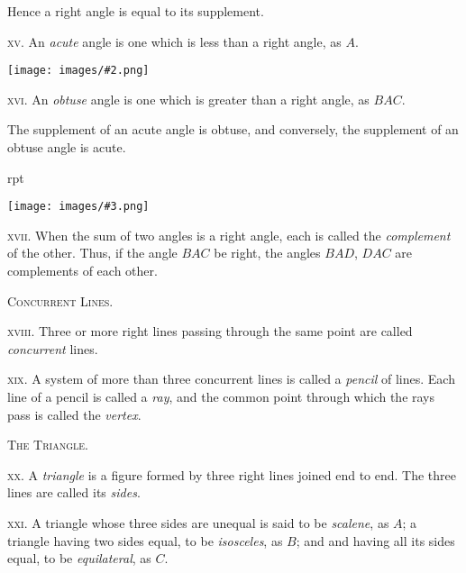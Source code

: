 \documentclass[oneside]{book}
\newcounter{wrapwidth}
\newcommand\imgflow[3]{
\setcounter{wrapwidth}{#1}
\begin{wrapfigure}[#2]{r}{\value{wrapwidth}pt}
\begin{center}
\vspace{-0.3in}
\texttt{[image: images/\#3.png]}
\end{center}
\end{wrapfigure}
}
\newcommand\imgcent[2]{
\begin{center}
\texttt{[image: images/\#2.png]}
\end{center}
}
\begin{document}
\begin{footnotesize}
Hence a right angle is equal to its supplement.
\par\end{footnotesize}

\textsc{xv}. An \textit{acute} angle is one which is less than a right
angle, as $A$.

\imgcent{266}{f005}

\textsc{xvi}. An \textit{obtuse} angle is one which is greater than a
right angle, as $BAC$.

\begin{footnotesize}
The supplement of an acute angle is obtuse, and conversely, the
supplement of an obtuse
angle is acute.
\par\end{footnotesize}

\imgflow{100}{7}{f006}
\textsc{xvii}. When the sum of two angles
is a right angle, each is called the
\textit{complement} of the other. Thus, if
the angle $BAC$ be right, the angles
$BAD$, $DAC$ are complements of each
other.

\begin{center}
\textsc{Concurrent Lines.}
\end{center}

\textsc{xviii}. Three or more right lines passing through the
same point are called \textit{concurrent} lines.

\textsc{xix}. A system of more than three concurrent lines is
called a \textit{pencil} of lines. Each line of a pencil is called
a \textit{ray}, and the common point through which the rays
pass is called the \textit{vertex}.


\begin{center}
\textsc{The Triangle.}
\end{center}

\textsc{xx}. A \textit{triangle} is a figure formed by three right
lines joined end to end. The three lines are called
its \textit{sides}.

\textsc{xxi}. A triangle whose three sides are unequal is said
to be \textit{scalene}, as $A$; a triangle having two sides equal,
to be \textit{isosceles}, as $B$; and and having all its sides equal,
to be \textit{equilateral}, as $C$.
\end{document}
